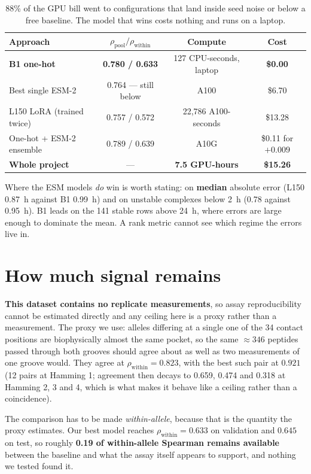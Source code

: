 \documentclass[11pt,a4paper]{article}
\newcommand{\rhop}{\rho_{\text{pool}}}
\newcommand{\rhow}{\rho_{\text{within}}}
\begin{document}
\begin{table}[H]
\centering\small
\begin{tabular}{@{}lccc@{}}
\toprule
\textbf{Approach} & $\rhop / \rhow$ & \textbf{Compute} & \textbf{Cost} \\
\midrule
\textbf{B1 one-hot} & \textbf{0.780 / 0.633} & 127 CPU-seconds, laptop & \textbf{\$0.00} \\
Best single ESM-2 & 0.764 --- still below & A100 & \$6.70 \\
L150 LoRA (trained twice) & 0.757 / 0.572 & 22{,}786 A100-seconds & \$13.28 \\
One-hot + ESM-2 ensemble & 0.789 / 0.639 & A10G & \$0.11 for $+0.009$ \\
\midrule
\textbf{Whole project} & --- & \textbf{7.5 GPU-hours} & \textbf{\$15.26} \\
\bottomrule
\end{tabular}
\caption{88\% of the GPU bill went to configurations that land inside seed noise or below a free
baseline. The model that wins costs nothing and runs on a laptop.}
\end{table}

Where the ESM models \emph{do} win is worth stating: on \textbf{median} absolute error (L150
0.87~h against B1 0.99~h) and on unstable complexes below 2~h (0.78 against 0.95~h). B1 leads on
the 141 stable rows above 24~h, where errors are large enough to dominate the mean. A rank metric
cannot see which regime the errors live in.

\section{How much signal remains}

\textbf{This dataset contains no replicate measurements}, so assay reproducibility cannot be
estimated directly and any ceiling here is a proxy rather than a measurement. The proxy we use:
alleles differing at a single one of the 34 contact positions are biophysically almost the same
pocket, so the same $\approx\!346$ peptides passed through both grooves should agree about as
well as two measurements of one groove would. They agree at $\rhow = \mathbf{0.823}$, with the
best such pair at $0.921$ (12 pairs at Hamming 1; agreement then decays to 0.659, 0.474 and
0.318 at Hamming 2, 3 and 4, which is what makes it behave like a ceiling rather than a
coincidence).

The comparison has to be made \emph{within-allele}, because that is the quantity the proxy
estimates. Our best model reaches $\rhow = 0.633$ on validation and $0.645$ on test, so roughly
\textbf{0.19 of within-allele Spearman remains available} between the baseline and what the
assay itself appears to support, and nothing we tested found it.
\end{document}
